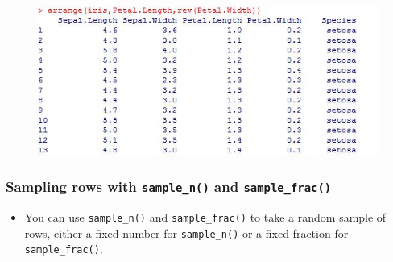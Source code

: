 \documentclass{beamer}
\begin{document}
\begin{frame}
	\begin{figure}
		\centering
		\includegraphics[width=0.97\linewidth]{images/irisarrange2}
		
	\end{figure}
	
\end{frame}


\begin{frame}
	\frametitle{Sampling rows with \texttt{sample\_n()} and \texttt{sample\_frac()}}
	\LARGE
	\begin{itemize}
		\item You can use \texttt{sample\_n()} and \texttt{sample\_frac()} to take a random sample of rows, either a fixed number for \texttt{sample\_n()} or a fixed fraction for \texttt{sample\_frac()}.
	\end{itemize}
\end{frame}
\end{document}
